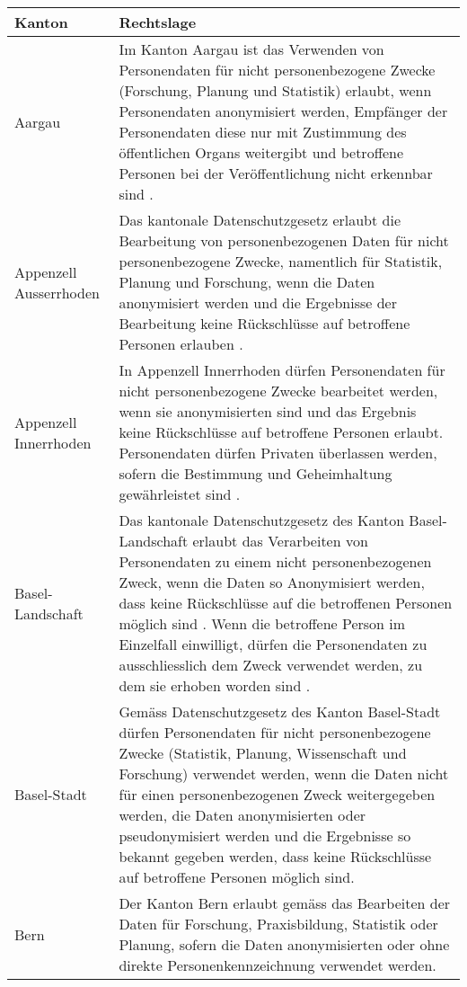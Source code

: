 \begin{longtable}{| p{} | p{}|} 
		\hline
		\textbf{Kanton} & \textbf{Rechtslage}  \\ 
    \hline
    Aargau & Im Kanton Aargau ist das Verwenden von Personendaten für nicht personenbezogene Zwecke (Forschung, Planung und Statistik) erlaubt, wenn Personendaten anonymisiert werden, Empfänger der Personendaten diese nur mit Zustimmung des öffentlichen Organs weitergibt und betroffene Personen bei der Veröffentlichung nicht erkennbar sind \parencite[§§ 19 Abs. 1]{DSSGAARGAU}. \\
    \hline
		Appenzell Ausserrhoden & Das kantonale Datenschutzgesetz erlaubt die Bearbeitung von personenbezogenen Daten für nicht personenbezogene Zwecke, namentlich für Statistik, Planung und Forschung, wenn die Daten anonymisiert werden und die Ergebnisse der Bearbeitung keine Rückschlüsse auf betroffene Personen erlauben \parencite[§§ 14 Abs. 1]{DSSGAARh}. \\
    \hline
		Appenzell Innerrhoden & In Appenzell Innerrhoden dürfen Personendaten für nicht personenbezogene Zwecke bearbeitet werden, wenn sie anonymisierten sind und das Ergebnis keine Rückschlüsse auf betroffene Personen erlaubt. Personendaten dürfen Privaten überlassen werden, sofern die Bestimmung und Geheimhaltung gewährleistet sind \parencite[§§ 7 Abs 1-2]{DSSGAIRh}.\\
    \hline
		Basel-Landschaft & Das kantonale Datenschutzgesetz des Kanton Basel-Landschaft erlaubt das Verarbeiten von Personendaten zu einem nicht personenbezogenen Zweck, wenn die Daten so Anonymisiert werden, dass keine Rückschlüsse auf die betroffenen Personen möglich sind \parencite[§§ 11 Abs. 2]{DSSGBL}. Wenn die betroffene Person im Einzelfall einwilligt, dürfen die Personendaten zu ausschliesslich dem Zweck verwendet werden, zu dem sie erhoben worden sind \parencite[§§ 11 Abs. 1]{DSSGBL}. \\
		\hline
		Basel-Stadt &  Gemäss Datenschutzgesetz des Kanton Basel-Stadt \parencite[§§ 10 Abs. 1]{DSSGBS} dürfen Personendaten für nicht personenbezogene Zwecke (Statistik, Planung, Wissenschaft und Forschung) verwendet werden, wenn die Daten nicht für einen personenbezogenen Zweck weitergegeben werden, die Daten anonymisierten oder pseudonymisiert werden und die Ergebnisse so bekannt gegeben werden, dass keine Rückschlüsse auf betroffene Personen möglich sind. \\
		\hline
    Bern & Der Kanton Bern erlaubt gemäss \parencite[§§ 15 Abs. 1]{DSSGBERN} das Bearbeiten der Daten für Forschung, Praxisbildung, Statistik oder Planung, sofern die Daten anonymisierten oder ohne direkte Personenkennzeichnung verwendet werden. \\

\end{longtable}
